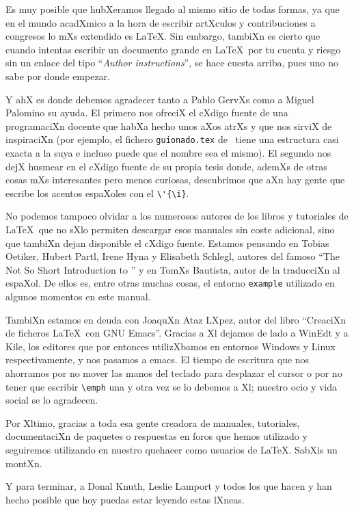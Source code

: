 Es muy posible que hubXeramos llegado al mismo sitio de todas formas,
ya que en el mundo acadXmico a la hora de escribir artXculos y
contribuciones a congresos lo mXs extendido es \LaTeX. Sin embargo,
tambiXn es cierto que cuando intentas escribir un documento grande
en \LaTeX\ por tu cuenta y riesgo sin un enlace del tipo ``\emph{Author
  instructions}'', se hace cuesta arriba, pues uno no sabe por donde
empezar.

Y ahX es donde debemos agradecer tanto a Pablo GervXs como a Miguel
Palomino su ayuda. El primero nos ofreciX el cXdigo fuente de una
programaciXn docente que habXa hecho unos aXos atrXs y que nos sirviX
de inspiraciXn (por ejemplo, el fichero \texttt{guionado.tex} de
\texis\ tiene una estructura casi exacta a la suya e incluso puede
que el nombre sea el mismo). El segundo nos dejX husmear en el cXdigo
fuente de su propia tesis donde, ademXs de otras cosas mXs
interesantes pero menos curiosas, descubrimos que aXn hay gente que
escribe los acentos espaXoles con el \verb+\'{\i}+.

No podemos tampoco olvidar a los numerosos autores de los libros y
tutoriales de \LaTeX\ que no sXlo permiten descargar esos manuales sin
coste adicional, sino que tambiXn dejan disponible el cXdigo fuente.
Estamos pensando en Tobias Oetiker, Hubert Partl, Irene Hyna y
Elisabeth Schlegl, autores del famoso ``The Not So Short Introduction
to \LaTeXe'' y en TomXs Bautista, autor de la traducciXn al espaXol. De
ellos es, entre otras muchas cosas, el entorno \texttt{example}
utilizado en algunos momentos en este manual.

TambiXn estamos en deuda con JoaquXn Ataz LXpez, autor del libro
``CreaciXn de ficheros \LaTeX\ con {GNU} Emacs''. Gracias a Xl dejamos
de lado a WinEdt y a Kile, los editores que por entonces utilizXbamos
en entornos Windows y Linux respectivamente, y nos pasamos a emacs. El
tiempo de escritura que nos ahorramos por no mover las manos del
teclado para desplazar el cursor o por no tener que escribir
\verb+\emph+ una y otra vez se lo debemos a Xl; nuestro ocio y vida
social se lo agradecen.

Por Xltimo, gracias a toda esa gente creadora de manuales, tutoriales,
documentaciXn de paquetes o respuestas en foros que hemos utilizado y
seguiremos utilizando en nuestro quehacer como usuarios de
\LaTeX. SabXis un montXn.

Y para terminar, a Donal Knuth, Leslie Lamport y todos los que hacen y
han hecho posible que hoy puedas estar leyendo estas lXneas.

\endinput
